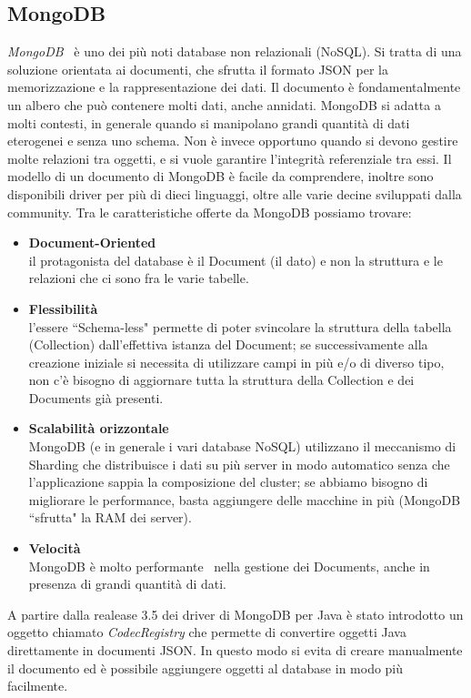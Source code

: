 \documentclass[12pt,a4paper,openright,oneside]{book}
\begin{document}
\subsection{MongoDB}
\textit{MongoDB}~\cite{mongodb} è uno dei più noti database non relazionali (NoSQL). Si tratta di una soluzione orientata ai documenti, che sfrutta il formato JSON per la memorizzazione e la rappresentazione dei dati. Il documento è fondamentalmente un albero che può contenere molti dati, anche annidati.
MongoDB si adatta a molti contesti, in generale quando si manipolano grandi quantità di dati eterogenei e senza uno schema. Non è invece opportuno quando si devono gestire molte relazioni tra oggetti, e si vuole garantire l’integrità referenziale tra essi.
Il modello di un documento di MongoDB è facile da comprendere, inoltre sono disponibili driver per più di dieci linguaggi, oltre alle varie decine sviluppati dalla community.
Tra le caratteristiche offerte da MongoDB possiamo trovare:
\begin{itemize}
    \item\textbf{Document-Oriented}\\
     il protagonista del database è il Document (il dato) e non la struttura e le relazioni che ci sono fra le varie tabelle.
     \item\textbf{Flessibilità}\\
    l'essere ``Schema-less" permette di poter svincolare la struttura della tabella (Collection) dall'effettiva istanza del Document; se successivamente alla creazione iniziale si necessita di utilizzare campi in più e/o di diverso tipo, non c'è bisogno di aggiornare tutta la struttura della Collection e dei Documents già presenti.
    \item\textbf{Scalabilità orizzontale}\\
    MongoDB (e in generale i vari database NoSQL) utilizzano il meccanismo di Sharding che distribuisce i dati su più server in modo automatico senza che l'applicazione sappia la composizione del cluster; se abbiamo bisogno di migliorare le performance, basta aggiungere delle macchine in più (MongoDB ``sfrutta" la RAM dei server).
    \item\textbf{Velocità}\\
    MongoDB è molto performante~\cite{mongo-eff} nella gestione dei Documents, anche in presenza di grandi quantità di dati.
\end{itemize}
A partire dalla realease 3.5 dei driver di MongoDB per Java è stato introdotto un oggetto chiamato \textit{CodecRegistry} che permette di convertire oggetti Java direttamente in documenti JSON.
In questo modo si evita di creare manualmente il documento ed è possibile aggiungere oggetti al database in modo più facilmente.
\end{document}
